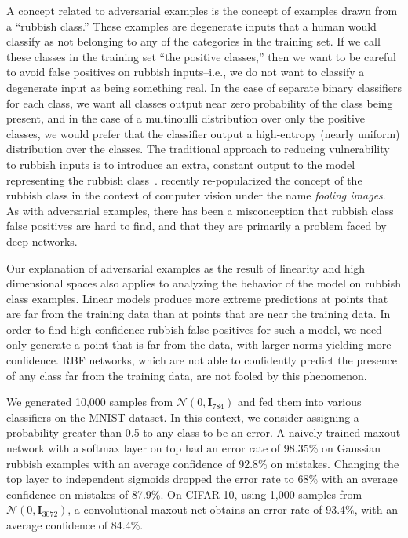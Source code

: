 \documentclass{article} %
\def\mI{{\bm{I}}}
\begin{document}
A concept related to adversarial examples is the concept of examples drawn from a ``rubbish class.''
These examples are degenerate inputs that a human would classify as not belonging to any of the
categories in the training set. If we call these classes in the training set ``the positive classes,''
then we want to be careful to avoid false positives on rubbish inputs--i.e., we do not want to classify
a degenerate input as being something real.
In the case of separate
binary classifiers for each class, we want all classes output near zero probability of the class
being present, and in the case of a multinoulli distribution over only the positive classes, we would prefer that the
classifier output a high-entropy (nearly uniform) distribution over the classes.
The traditional approach to reducing
vulnerability to rubbish inputs is to introduce an extra, constant output to the model representing
the rubbish class~\citep{LeCun+98}.
\citet{fool} recently re-popularized the concept of the rubbish class in the context of computer vision
under the name {\em fooling images}. As with adversarial examples, there has been a misconception that
rubbish class false positives are hard to find, and that they are primarily a problem faced by deep networks.

Our explanation of adversarial examples as the result of linearity and high dimensional spaces
also applies to analyzing the behavior of the model on rubbish class examples. Linear models produce more extreme predictions at points that are
far from the training data than at points that are near the training data. In order to find high
confidence rubbish false positives for such a model, we need only generate a point that is far from
the data, with larger norms yielding more confidence. RBF networks, which are not able to
confidently predict the presence of any class
far from the training data, are not fooled by this phenomenon.

We generated 10,000 samples from $\mathcal{N}(0, \mI_{784})$ and fed them into various classifiers
on the MNIST dataset. In this context, we consider assigning a probability greater than 0.5 to any
class to be an error. A naively trained maxout network with a softmax layer on top had an error rate
of 98.35\% on Gaussian rubbish examples with an average confidence of 92.8\% on mistakes.
Changing the top layer to independent sigmoids dropped the error rate to 68\% with an average
confidence on mistakes of 87.9\%. 
On CIFAR-10, using 1,000 samples from $\mathcal{N}(0, \mI_{3072})$, a convolutional maxout net
obtains an error rate of 93.4\%, with an average confidence of 84.4\%.
\end{document}
